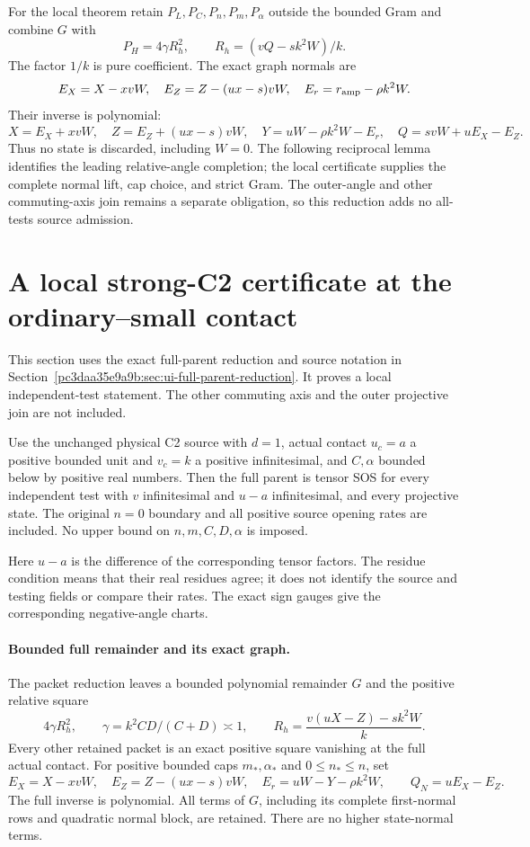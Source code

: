 For the local theorem retain $P_L,P_C,P_n,P_m,P_\alpha$ outside the
bounded Gram and combine $G$ with
\[
 P_H=4\gamma R_h^2,\qquad R_h=(vQ-sk^2W)/k.
 \tag{UR17}
\]
The factor $1/k$ is pure coefficient. The exact graph normals are
\[
 E_X=X-xvW,\quad E_Z=Z-(ux-s)vW,\quad
 E_r=r_{\rm amp}-\rho k^2W.
\]
Their inverse is polynomial:
\[
 X=E_X+xvW,\quad Z=E_Z+(ux-s)vW,\quad
 Y=uW-\rho k^2W-E_r,\quad Q=svW+uE_X-E_Z.
\]
Thus no state is discarded, including $W=0$. The following reciprocal
lemma identifies the leading relative-angle completion; the local
certificate supplies the complete normal lift, cap choice, and strict
Gram. The outer-angle and other commuting-axis join remains a separate
obligation, so this reduction adds no all-tests source admission.


\section{\texorpdfstring{A local strong-C2 certificate at the ordinary--small contact}{A local strong-C2 certificate at the ordinary--small contact}}
\label{component:p76545700d90b}

\label{p76545700d90b:sec:local-ui-certificate}

This section uses the exact full-parent reduction and source notation
in Section~\ref{pc3daa35e9a9b:sec:ui-full-parent-reduction}. It proves a local independent-test
statement. The other commuting axis and the outer projective join
are not included.

\begin{theorem}
Use the unchanged physical C2 source with $d=1$, actual contact
$u_c=a$ a positive bounded unit and $v_c=k$ a positive infinitesimal,
and $C,\alpha$ bounded below by positive real numbers. Then the full
parent is tensor SOS for every independent test with $v$ infinitesimal
and $u-a$ infinitesimal, and every projective state. The original
$n=0$ boundary and all positive source opening rates are included.
No upper bound on $n,m,C,D,\alpha$ is imposed.
\end{theorem}

Here $u-a$ is the difference of the corresponding tensor factors.
The residue condition means that their real residues agree; it does
not identify the source and testing fields or compare their rates.
The exact sign gauges give the corresponding negative-angle charts.

\paragraph{Bounded full remainder and its exact graph.}
The packet reduction leaves a bounded polynomial remainder $G$ and
the positive relative square
\[
 4\gamma R_h^2,\qquad
 \gamma=k^2CD/(C+D)\asymp1,\qquad
 R_h=\frac{v(uX-Z)-s k^2W}{k}.
\]
Every other retained packet is an exact positive square vanishing
at the full actual contact. For positive bounded caps $m_*,\alpha_*$
and $0\le n_*\le n$, set
\[
 E_X=X-xvW,\quad E_Z=Z-(ux-s)vW,\quad
 E_r=uW-Y-\rho k^2W,
 \qquad Q_N=uE_X-E_Z.
\]
The full inverse is polynomial. All terms of $G$, including its
complete first-normal rows and quadratic normal block, are retained.
There are no higher state-normal terms.

